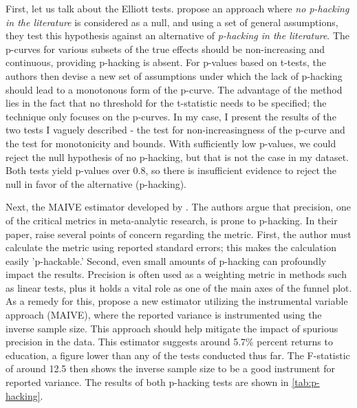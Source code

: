 First, let us talk about the Elliott tests. \cite{elliott2022hacking} propose an approach where \textit{no p-hacking in the literature} is considered as a null, and using a set of general assumptions, they test this hypothesis against an alternative of \textit{p-hacking in the literature}. The p-curves for various subsets of the true effects should be non-increasing and continuous, providing p-hacking is absent. For p-values based on t-tests, the authors then devise a new set of assumptions under which the lack of p-hacking should lead to a monotonous form of the p-curve. The advantage of the method lies in the fact that no threshold for the t-statistic needs to be specified; the technique only focuses on the p-curves. In my case, I present the results of the two tests I vaguely described - the test for non-increasingness of the p-curve and the test for monotonicity and bounds. With sufficiently low p-values, we could reject the null hypothesis of no p-hacking, but that is not the case in my dataset. Both tests yield p-values over 0.8, so there is insufficient evidence to reject the null in favor of the alternative (p-hacking).

Next, the \ac{MAIVE} estimator developed by \cite{irsova2023maive}. The authors argue that precision, one of the critical metrics in meta-analytic research, is prone to p-hacking. In their paper, \cite{irsova2023maive} raise several points of concern regarding the metric. First, the author must calculate the metric using reported standard errors; this makes the calculation easily 'p-hackable.' Second, even small amounts of p-hacking can profoundly impact the results. Precision is often used as a weighting metric in methods such as linear tests, plus it holds a vital role as one of the main axes of the funnel plot. As a remedy for this, \cite{irsova2023maive} propose a new estimator utilizing the instrumental variable approach (\ac{MAIVE}), where the reported variance is instrumented using the inverse sample size. This approach should help mitigate the impact of spurious precision in the data. This estimator suggests around 5.7\% percent returns to education, a figure lower than any of the tests conducted thus far. The F-statistic of around 12.5 then shows the inverse sample size to be a good instrument for reported variance. The results of both p-hacking tests are shown in \autoref{tab:p-hacking}.



